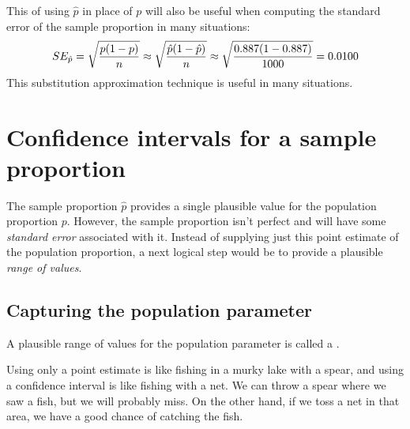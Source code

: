 This  of using $\hat{p}$ in
place of $p$ will also be useful when computing the standard error
of the sample proportion in many situations:
\begin{align*}
SE_{\hat{p}}
    = \sqrt{\frac{p (1 - p)}{n}}
    \approx \sqrt{\frac{\hat{p} (1 - \hat{p})}{n}}
    \approx \sqrt{\frac{0.887{}
        (1 - 0.887{})}{1000{}}}
    = 0.0100{}
\end{align*}
This substitution approximation technique is useful in many
situations.




\section[Confidence interval for a sample proportion]{Confidence
    intervals for a sample\\proportion} %
\label{confidenceIntervals}



The sample proportion $\hat{p}$ provides a single plausible value
for the population proportion $p$. However, the sample proportion
isn't perfect and will have some \emph{standard error}
associated with it. Instead of supplying just this point estimate
of the population proportion, a next logical step would be
to provide a plausible \emph{range of values}.

\subsection{Capturing the population parameter}

A plausible range of values for the population parameter
is called a .

Using only a point estimate is like fishing in a murky
lake with a spear, and using a confidence interval is
like fishing with a net. We can throw a spear where we
saw a fish, but we will probably miss. On the other hand,
if we toss a net in that area, we have a good chance of
catching the fish.


